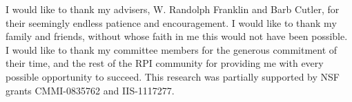  
 
I would like to thank my advisers, W. Randolph Franklin and Barb Cutler, for their seemingly endless patience and encouragement. I would like to thank my family and friends, without whose faith in me this would not have been possible. I would like to thank my committee members for the generous commitment of their time, and the rest of the RPI community for providing me with every possible opportunity to succeed.
% 
This research was partially supported by NSF grants CMMI-0835762 and IIS-1117277.
